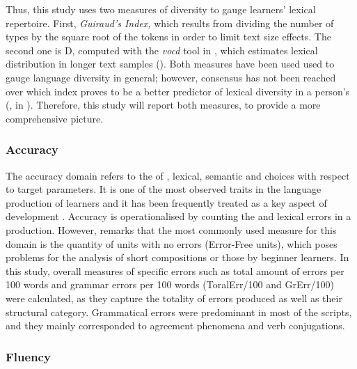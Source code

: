 \documentclass[output=paper]{langsci/langscibook}
\begin{document}
Thus, this study uses two measures of diversity to gauge learners’ lexical repertoire. First, \textit{Guiraud’s Index,} which results from dividing the number of types by the square root of the tokens in order to limit text size effects. The second one is D, computed with the \textit{vocd} tool in  \citep{MacWhinney2000}, which estimates lexical distribution in longer text samples (\citealt{MalvernRichards2000}).  Both measures have been used used to gauge language diversity in general; however, consensus has not been reached over which index proves to be a better predictor of lexical diversity in a person’s  (\citealt{McCarthyJarvis2010}, in \citealt{Pallotti2015}). Therefore, this study will report both measures, to provide a more comprehensive picture.

\subsubsection{Accuracy}

The accuracy domain refers to the  of , lexical, semantic and  choices with respect to  target parameters. It is one of the most observed traits in the language production of  learners and it has been frequently treated as a key aspect of  development \citep{HousenEtAl2012}. Accuracy is operationalised by counting the  and lexical errors in a  production. However, \citet{Polio1997,Polio2001} remarks that the most commonly used measure for this domain is the quantity of units with no errors (Error-Free units), which poses problems for the analysis of short compositions or those by beginner learners. In this study, overall measures of specific errors such as total amount of errors per 100 words and grammar errors per 100 words (ToralErr/100 and GrErr/100) were calculated,  as they capture the totality of errors produced as well as their structural category. Grammatical errors were predominant in most of the scripts, and they mainly corresponded to agreement phenomena and verb conjugations.

\subsubsection{Fluency}
\end{document}
